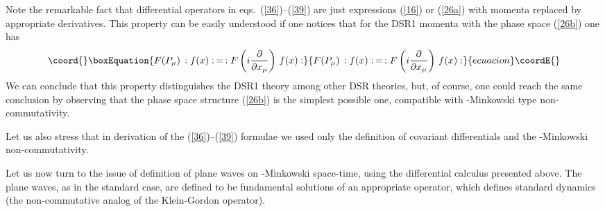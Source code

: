 \documentclass  [12pt] {article}
\begin{document}
Note the remarkable fact that differential operators in
eqs.~(\ref{36})--(\ref{39}) are just expressions (\ref{16}) or (\ref{26a}) with
momenta replaced by appropriate derivatives. This property can be easily
understood if one notices that for the DSR1 momenta with the phase space
(\ref{26b}) one has \cite{5dcalc3}
\begin{equation}\coord{}\boxEquation{\label{40}
 F(P_\mu) \, :f(x):\, = \, :F\left(i\frac{\partial}{\partial x_\mu}\right)\, f(x):
}{F(P_\mu) \, :f(x):\, = \, :F\left(i\frac{\partial}{\partial x_\mu}\right)\, f(x):
}{ecuacion}\coordE{}\end{equation}
We can conclude that  this property distinguishes the DSR1 theory among other
DSR theories, but, of course, one could reach the same conclusion by observing
that the phase space structure (\ref{26b}) is the simplest possible one,
compatible with \myHighlight{$\kappa$}\coordHE{}-Minkowski type non-commutativity.

Let us also stress that in derivation of the  (\ref{36})--(\ref{39}) formulae
we used only the definition of covariant differentials and the
\myHighlight{$\kappa$}\coordHE{}-Minkowski non-commutativ\-ity.
\newline

Let us now turn to the issue of definition of plane waves on
\myHighlight{$\kappa$}\coordHE{}-Minkowski space-time, using the differential calculus
presented above. The plane waves, as in the standard case, are
defined to be fundamental solutions of an appropriate operator,
which defines standard dynamics (the non-commutative analog of the
Klein-Gordon operator).
\end{document}
